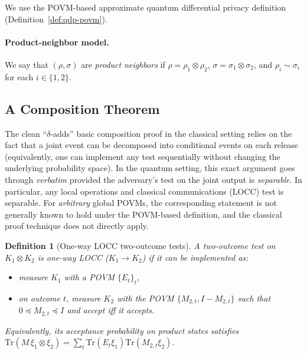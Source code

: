 \documentclass[11pt]{article}
\def\Tr{\mathrm{Tr}}
\theoremstyle{plain}
\newtheorem{definition}[theo]{Definition}
\theoremstyle{remark}
\begin{document}
We use the POVM-based approximate quantum differential privacy definition (Definition~\ref{def:qdp-povm}).

\paragraph{Product-neighbor model.}
We say that $(\rho,\sigma)$ are \emph{product neighbors} if $\rho=\rho_1\otimes\rho_2$,
$\sigma=\sigma_1\otimes\sigma_2$, and $\rho_i\sim\sigma_i$ for each $i\in\{1,2\}$.


\subsection{A Composition Theorem}

The clean ``$\delta$-adds'' basic composition proof in the classical setting relies on the
fact that a joint event can be decomposed into conditional events on each release (equivalently,
one can implement any test sequentially without changing the underlying probability space).
In the quantum setting, this exact argument goes through \emph{verbatim} provided the
adversary's test on the joint output is \emph{separable}. In particular, any local operations and classical communications (LOCC) test is
separable. For \emph{arbitrary} global POVMs, the corresponding statement is not generally
known to hold under the POVM-based definition, and the classical proof technique does not
directly apply.

\begin{definition}[One-way LOCC two-outcome tests]
A two-outcome test on $K_1\otimes K_2$ is one-way LOCC ($K_1\to K_2$) if it can be implemented as:
\begin{itemize}
\item measure $K_1$ with a POVM $\{E_t\}_t$,
\item on outcome $t$, measure $K_2$ with the POVM $\{M_{2,t}, I- M_{2,t}\}$ such that $0\preceq M_{2,t}\preceq I$ and accept iff it accepts.
\end{itemize}
Equivalently, its acceptance probability on product states satisfies
$\Tr(M\,\xi_1\otimes\xi_2)=\sum_t \Tr(E_t\xi_1)\Tr(M_{2,t}\xi_2)$.
\label{def:one-way-locc}
\end{definition}
\end{document}
